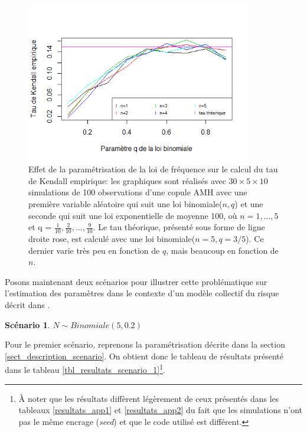 \documentclass[11pt]{article}
\newtheorem{scenario}{Scénario}
\begin{document}
	 \begin{figure}[H]
	 	\centering
	 	\includegraphics[height=7cm]{graph/Tau_kendall_empirique.png}
	 	\caption[Effet de la paramétrisation de la loi de fréquence sur le calcul du tau de Kendall empirique.]{Effet de la paramétrisation de la loi de fréquence sur le calcul du tau de Kendall empirique: les graphiques sont réalisés avec $30 \times 5 \times 10$ simulations de 100 observations d'une copule AMH avec une première variable aléatoire qui suit une loi binomiale($n,q$) et une seconde qui suit une loi exponentielle de moyenne 100, où $n = 1, \dots, 5$ et q = $\frac{1}{10}, \frac{2}{10}, \dots, \frac{9}{10}$. Le tau théorique, présenté sous forme de ligne droite rose, est calculé avec une loi binomiale($n=5, q=3/5$). Ce dernier varie très peu en fonction de $q$, mais beaucoup en fonction de $n$.} 
	 	\label{graph_kendall_va_mixtes}
	 \end{figure}
 	
 	Posons maintenant deux scénarios pour illustrer cette problématique sur l'estimation des paramètres dans le contexte d'un modèle collectif du risque décrit dans \cite{Itre5}.
 	
 	\begin{scenario}
 		\textbf{$N \sim Binomiale(5, 0.2)$}
 	\end{scenario}
 		Pour le premier scénario, reprenons la paramétrisation décrite dans la section \ref{sect_description_scenario}. On obtient donc le tableau de résultats présenté dans le tableau \ref{tbl_resultats_scenario_1}\footnote{À noter que les résultats diffèrent légèrement de ceux présentés dans les tableaux \ref{resultats_app1} et \ref{resultats_app2} du fait que les simulations n'ont pas le même encrage (\textit{seed}) et que le code utilisé est différent.}.
 		
\end{document}

